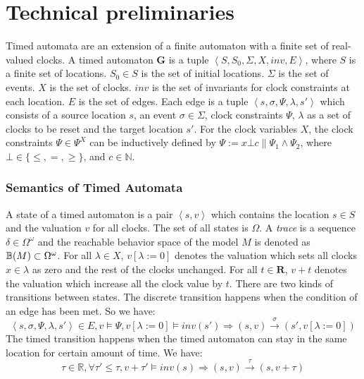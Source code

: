 \section{Technical preliminaries}
\label{preliminaries}
Timed automata \cite{timed_automata} are an extension of a finite automaton with a finite set of real-valued clocks. 
A timed automaton \textbf{G} is a tuple $\left\langle S,S_0,\Sigma,X,inv,E\right\rangle$, where
 $S$ is a finite set of locations.
 $S_0\in S$ is the set of initial locations.
 $\Sigma$ is the set of events.
$X$ is the set of clocks.
$inv$ is the set of invariants for clock constraints at each location.
 $E$ is the set of edges. Each edge is a tuple $\left\langle s,\sigma,\Psi,\lambda,s'\right\rangle$ which consists of a source location $s$, an event $\sigma\in\Sigma$, clock constraints $\Psi$, $\lambda$ as a set of clocks to be reset and the target location $s'$. For the clock variables $X$, the clock constraints $\Psi\in\Psi^X$ can be inductively defined by $\Psi:=x\bot c\|\Psi_1\wedge\Psi_2$, where $\bot\in\{\leq,=,\geq\}$, and $c\in\mathbb{N}$.
\vspace{-10pt}
\subsubsection{Semantics of Timed Automata}
A state of a timed automaton is a pair $\left\langle s,v\right\rangle$ which contains the location $s\in S$ and the valuation $v$ for all clocks. The set of all states is $\Omega$. A \emph{trace} is a sequence $\delta\in \Omega^\omega$ and the reachable behavior space of the model $M$ is denoted as $\mathbb{B}(M)\subset \Omega^\omega$. For all $\lambda\in X$, $v[\lambda :=0]$ denotes the valuation which sets all clocks $x\in\lambda$ as zero and the rest of the clocks unchanged. For all $t\in \textbf{R}$, $v+t$ denotes the valuation which increase all the clock value by $t$. There are two kinds of transitions between states. The \textsf{discrete transition} happens when the condition of an edge has been met. So we have:
$$\left\langle s,\sigma,\Psi,\lambda,s'\right\rangle\in E,v\models \Psi,v[\lambda :=0]\models inv(s')\Rightarrow (s,v)\xrightarrow{\sigma}(s',v[\lambda :=0])$$
The \textsf{timed transition} happens when the timed automaton can stay in the same location for certain amount of time. We have:
$$\tau\in \mathbb{R},\forall \tau'\leq\tau, v+\tau'\models inv(s)\Rightarrow (s,v)\xrightarrow{\tau}(s,v+\tau)$$
\vspace{-15pt}
